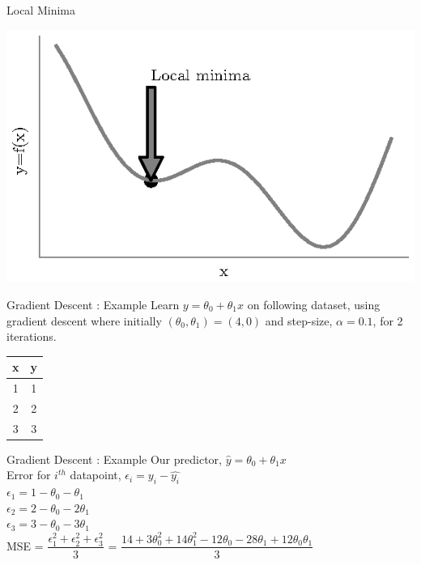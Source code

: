\documentclass{beamer}
\begin{document}
	\begin{frame}{Local Minima}
\begin{center}
	\includegraphics[totalheight=6cm]{gradient-descent/local-minima.eps}
\end{center}
\end{frame}

	\begin{frame}{Gradient Descent : Example}
Learn $y = \theta_0 + \theta_1 x$ on following dataset, using gradient descent where initially $(\theta_0, \theta_1) = (4,0)$ and step-size, $\alpha  = 0.1$, for 2 iterations. 
\begin{table}[]
	\centering
	\label{tab:my-table}
	\begin{tabular}{|c|c|}
		\hline
		\textbf{x} & \textbf{y} \\ \hline
		1 & 1 \\ \hline
		2 & 2 \\ \hline
		3 & 3 \\ \hline
	\end{tabular}
\end{table}
\end{frame}



\begin{frame}{Gradient Descent : Example}
Our predictor, $\hat{y} = \theta_0 + \theta_1x$\\
\vspace{1cm}
Error for $i^{th}$ datapoint, $\epsilon_i = y_i - \hat{y_i}$\\
$\epsilon_1 = 1 - \theta_0 - \theta_1$ \\
$\epsilon_2 = 2 - \theta_0 - 2\theta_1$ \\
$\epsilon_3 = 3 - \theta_0 - 3\theta_1$ \\

\vspace{1cm}
MSE = $\dfrac{\epsilon_1^2 + \epsilon_2^2 + \epsilon_3^2}{3}$ = $\dfrac{14 + 3\theta_0^2 + 14\theta_1^2 -12\theta_0 - 28\theta_1 + 12\theta_0\theta_1}{3}$\\
\end{frame}
\end{document}
